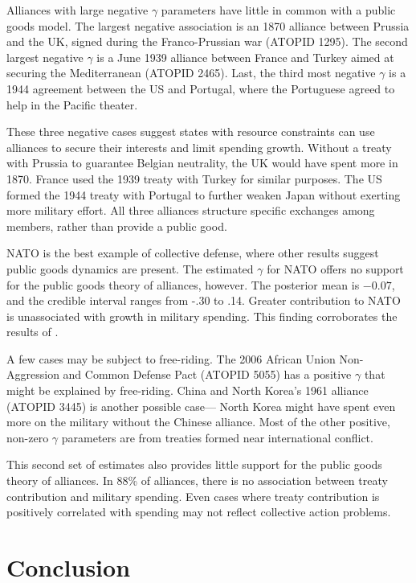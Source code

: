 \documentclass[12pt]{article}
\begin{document}
Alliances with large negative $\gamma$ parameters have little in common with a public goods model. 
The largest negative association is an 1870 alliance between Prussia and the UK, signed during the Franco-Prussian war (ATOPID 1295). 
The second largest negative $\gamma$ is a June 1939 alliance between France and Turkey aimed at securing the Mediterranean (ATOPID 2465).
Last, the third most negative $\gamma$ is a 1944 agreement between the US and Portugal, where the Portuguese agreed to help in the Pacific theater. 


These three negative cases suggest states with resource constraints can use alliances to secure their interests and limit spending growth. 
Without a treaty with Prussia to guarantee Belgian neutrality, the UK would have spent more in 1870.
France used the 1939 treaty with Turkey for similar purposes. 
The US formed the 1944 treaty with Portugal to further weaken Japan without exerting more military effort. 
All three alliances structure specific exchanges among members, rather than provide a public good. 


NATO is the best example of collective defense, where other results suggest public goods dynamics are present. 
The estimated $\gamma$ for NATO offers no support for the public goods theory of alliances, however. 
The posterior mean is $-0.07$, and the credible interval ranges from -.30 to .14.  
Greater contribution to NATO is unassociated with growth in military spending. 
This finding corroborates the results of \citet{PluemperNeumayer2015}. 


A few cases may be subject to free-riding. 
The 2006 African Union Non-Aggression and Common Defense Pact (ATOPID 5055) has a positive $\gamma$ that might be explained by free-riding.  
China and North Korea's 1961 alliance (ATOPID 3445) is another possible case--- North Korea might have spent even more on the military without the Chinese alliance. 
Most of the other positive, non-zero $\gamma$ parameters are from treaties formed near international conflict. 


This second set of estimates also provides little support for the public goods theory of alliances. 
In 88\% of alliances, there is no association between treaty contribution and military spending. 
Even cases where treaty contribution is positively correlated with spending may not reflect collective action problems. 



\section{Conclusion}
\end{document}
